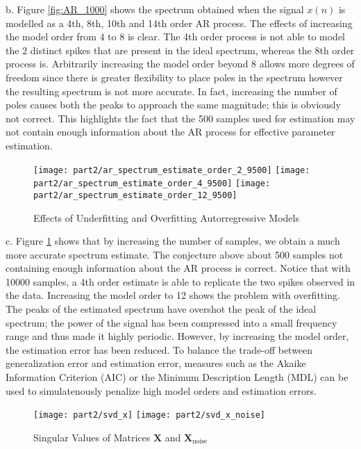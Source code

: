\noindent{}b. Figure \ref{fig:AR_1000} shows the spectrum obtained when the signal $x(n)$ is modelled as a 4th, 8th, 10th and 14th order AR process. The effects of increasing the model order from $4$ to $8$ is clear. The 4th order process is not able to model the 2 distinct spikes that are present in the ideal spectrum, whereas the 8th order process is. Arbitrarily increasing the model order beyond 8 allows more degrees of freedom since there is greater flexibility to place poles in the spectrum however the resulting spectrum is not more accurate. In fact, increasing the number of poles causes both the peaks to approach the same magnitude; this is obviously not correct. This highlights the fact that the 500 samples used for estimation may not contain enough information about the AR process for effective parameter estimation. \\

\begin{figure}[H]
\centering{}
\texttt{[image: part2/ar\_spectrum\_estimate\_order\_2\_9500]}
\texttt{[image: part2/ar\_spectrum\_estimate\_order\_4\_9500]}
\texttt{[image: part2/ar\_spectrum\_estimate\_order\_12\_9500]}
\caption{Effects of Underfitting and Overfitting Autorregressive Models}
\label{fig:AR_10000}
\end{figure}

\noindent{}c. Figure \ref{fig:AR_10000} shows that by increasing the number of samples, we obtain a much more accurate spectrum estimate. The conjecture above about 500 samples not containing enough information about the AR process is correct. Notice that with 10000 samples, a 4th order estimate is able to replicate the two spikes observed in the data. Increasing the model order to 12 shows the problem with overfitting. The peaks of the estimated spectrum have overshot the peak of the ideal spectrum; the power of the signal has been compressed into a small frequency range and thus made it highly periodic. However, by increasing the model order, the estimation error has been reduced. To balance the trade-off between generalization error and estimation error, measures such as the Akaike Information Criterion (AIC) or the Minimum Description Length (MDL) can be used to simulatenously penalize high model orders and estimation errors. 

\begin{figure}[H]
\centering{}
\texttt{[image: part2/svd\_x]}
\texttt{[image: part2/svd\_x\_noise]}
\caption{Singular Values of Matrices $\textbf{X}$ and $\textbf{X}_{\text{noise}}$}
\end{figure}

